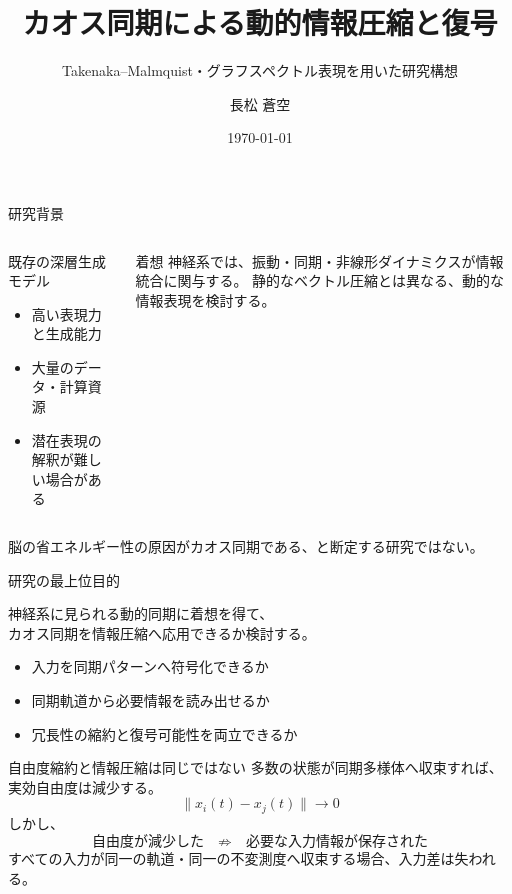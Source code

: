 \documentclass[aspectratio=169,11pt]{beamer}
\title{カオス同期による動的情報圧縮と復号}
\subtitle{Takenaka--Malmquist・グラフスペクトル表現を用いた研究構想}
\author{長松 蒼空}
\institute{卒業研究テーマ発表}
\date{\today}
\begin{document}
\begin{frame}
  \titlepage
\end{frame}

\begin{frame}{研究背景}
  \begin{columns}[T]
    \begin{block}{既存の深層生成モデル}
      \begin{itemize}
        \item 高い表現力と生成能力
        \item 大量のデータ・計算資源
        \item 潜在表現の解釈が難しい場合がある
      \end{itemize}
    \end{block}
    \begin{block}{着想}
      神経系では、振動・同期・非線形ダイナミクスが情報統合に関与する。
      静的なベクトル圧縮とは異なる、動的な情報表現を検討する。
    \end{block}
  \end{columns}
  \vfill
  \alert{脳の省エネルギー性の原因がカオス同期である、と断定する研究ではない。}
\end{frame}

\begin{frame}{研究の最上位目的}
  \begin{center}
    \Large
    神経系に見られる動的同期に着想を得て、\\[4mm]
    \alert{カオス同期を情報圧縮へ応用できるか検討する。}
  \end{center}
  \vfill
  \begin{itemize}
    \item 入力を同期パターンへ符号化できるか
    \item 同期軌道から必要情報を読み出せるか
    \item 冗長性の縮約と復号可能性を両立できるか
  \end{itemize}
\end{frame}

\begin{frame}{自由度縮約と情報圧縮は同じではない}
  多数の状態が同期多様体へ収束すれば、実効自由度は減少する。
  \[
    \|x_i(t)-x_j(t)\|\longrightarrow 0
  \]
  しかし、
  \[
    \boxed{
      \text{自由度が減少した}
      \quad\not\Rightarrow\quad
      \text{必要な入力情報が保存された}
    }
  \]
  すべての入力が同一の軌道・同一の不変測度へ収束する場合、入力差は失われる。
\end{frame}
\end{document}
